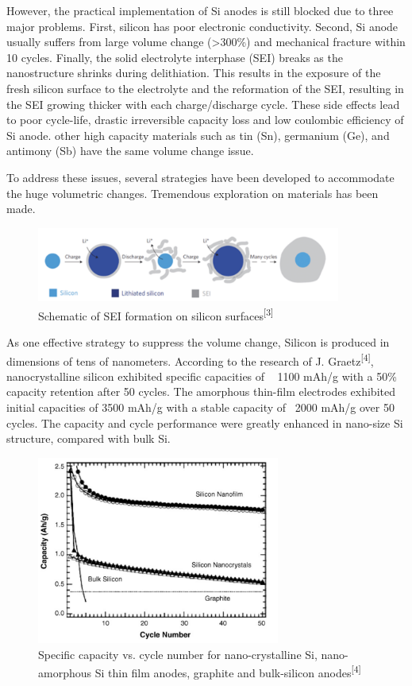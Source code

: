However, the practical implementation of Si anodes is still blocked due to three major problems. First, silicon has poor electronic conductivity. Second, Si anode usually suffers from large volume change (>300\%) and mechanical fracture within 10 cycles. Finally, the solid electrolyte interphase (SEI) breaks as the nanostructure shrinks during delithiation. This results in the exposure of the fresh silicon surface to the electrolyte and the reformation of the SEI, resulting in the SEI growing thicker with each charge/discharge cycle. These side effects lead to poor cycle-life, drastic irreversible capacity loss and low coulombic efficiency of Si anode. other high capacity materials such as tin (Sn), germanium (Ge), and antimony (Sb) have the same volume change issue. 

To address these issues, several strategies have been developed to accommodate the huge volumetric changes. Tremendous exploration on materials has been made.
\begin{figure}[H]
\centering
\includegraphics[width=10cm]{src/fig/fig4.png}
\caption{Schematic of SEI formation on silicon surfaces\textsuperscript{[3]}}
\end{figure}
As one effective strategy to suppress the volume change, Silicon is produced in dimensions of tens of nanometers. According to the research of J. Graetz\textsuperscript{[4]}, nanocrystalline silicon exhibited specific capacities of ~ 1100 mAh/g with a 50\% capacity retention after 50 cycles. The amorphous thin-film electrodes exhibited initial capacities of 3500 mAh/g with a stable capacity of ~2000 mAh/g over 50 cycles. The capacity and cycle performance were greatly enhanced in nano-size Si structure, compared with bulk Si.
\begin{figure}[H]
\centering
\includegraphics[width=8cm]{src/fig/fig5.png}
\caption{Specific capacity vs. cycle number for nano-crystalline Si, nano-amorphous Si thin film anodes, graphite and bulk-silicon anodes\textsuperscript{[4]}}
\end{figure}
